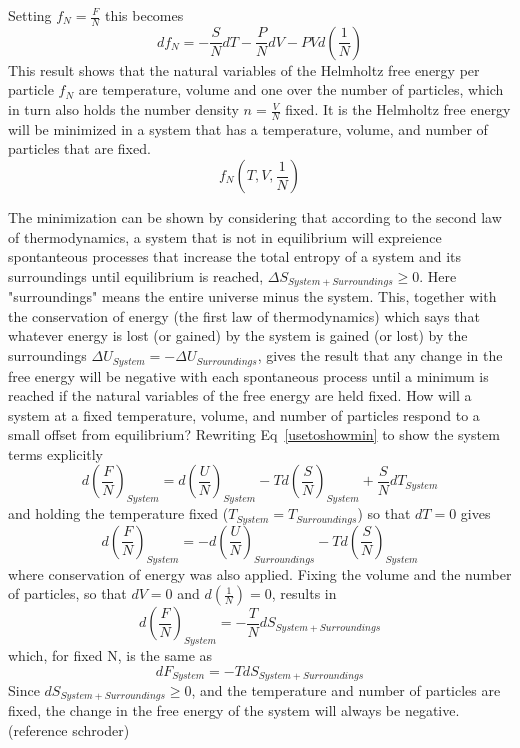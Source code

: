 \documentclass[12pt]{article}
\begin{document}
Setting $f_N=\frac{F}{N}$ this becomes
\begin{equation}df_N=-\frac{S}{N}dT-\frac{P}{N}dV-PVd\left(\frac{1}{N}\right)\end{equation}
This result shows that the natural variables of the Helmholtz free energy per particle $f_N$ are temperature, volume and one over the number of particles, which in turn also holds the number density $n=\frac{V}{N}$ fixed. It is the Helmholtz free energy will be minimized in a system that has a temperature, volume, and number of particles that are fixed.
\begin{equation}f_N(T,V, \frac{1}{N})\end{equation} 

The minimization can be shown by considering that according to the second law of thermodynamics, a system that is not in equilibrium will expreience spontanteous processes that increase the total entropy of a system and its surroundings until equilibrium is reached, $\Delta{S}_{System + Surroundings} \geq 0$. Here "surroundings" means the entire universe minus the system. This, together with the conservation of energy (the first law of thermodynamics) which says that whatever energy is lost (or gained) by the system is gained (or lost) by the surroundings $\Delta{U}_{System}=-\Delta{U}_{Surroundings}$, gives the result that any change in the free energy will be negative with each spontaneous process until a minimum is reached if the natural variables of the free energy are held fixed.  How will a system at a fixed temperature, volume, and number of particles respond to a small offset from equilibrium? Rewriting Eq~\ref{usetoshowmin} to show the system terms explicitly
\begin{equation}d\left(\frac{F}{N}\right)_{System}=d\left(\frac{U}{N}\right)_{System}-Td\left(\frac{S}{N}\right)_{System}+\frac{S}{N}dT_{System}\end{equation}
and holding the temperature fixed ($T_{System}=T_{Surroundings}$) so that $dT=0$ gives
\begin{equation}d\left(\frac{F}{N}\right)_{System}=-d\left(\frac{U}{N}\right)_{Surroundings}-Td\left(\frac{S}{N}\right)_{System}\end{equation}
where conservation of energy was also applied. Fixing the volume and the number of particles, so that $dV=0$ and $d\left(\frac{1}{N}\right)=0$, results in
\begin{equation}d\left(\frac{F}{N}\right)_{System}=-\frac{T}{N}dS_{System+Surroundings} \end{equation}which, for fixed N, is the same as
\begin{equation}dF_{System}=-TdS_{System+Surroundings} \end{equation} Since $dS_{System+Surroundings} \geq{0}$, and the temperature and number of particles are fixed, the change in the free energy of the system will always be negative. (reference schroder)
\end{document}
